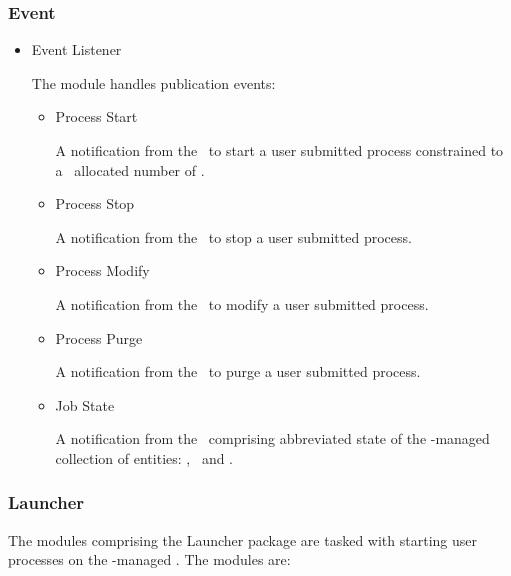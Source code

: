     \subsubsection{Event}  
    
    \begin{itemize}
      \item Event Listener
      
      The module handles publication events:
      \begin{itemize}
      \item Process Start 
      
      A notification from the \varProcessManager~to start a user submitted 
      process constrained to a \varResourceManager~allocated number of \varShares.
      
      \item Process Stop
      
      A notification from the \varProcessManager~to stop a user submitted 
      process.
      
      \item Process Modify
            
      A notification from the \varProcessManager~to modify a user submitted 
      process.
      
      \item Process Purge
                  
      A notification from the \varProcessManager~to purge a user submitted 
      process.
      
      \item Job State
                        
      A notification from the \varProcessManager~comprising abbreviated
      state of the \varDUCC-managed collection of entities: 
      \varJobs, \varReservations~and \varServices.
      
      \end{itemize}  

    \end{itemize}     
                 
    \subsubsection{Launcher}   
          
    The modules comprising the Launcher package are tasked with
    starting user processes on the \varAgent-managed \varNodeMachineComputer.
    The modules are:
            
